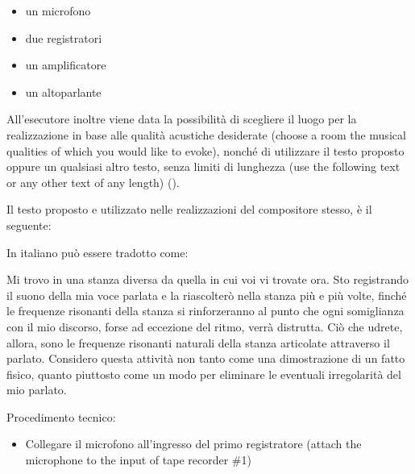 \begin{itemize}
    \item un microfono
    \item due registratori
    \item un amplificatore
    \item un altoparlante
\end{itemize}

All'esecutore inoltre viene data la possibilità di scegliere il luogo per la realizzazione in base alle qualità acustiche desiderate (choose a room the musical qualities of which you would like to evoke), nonché di utilizzare il testo proposto oppure un qualsiasi altro testo, senza limiti di lunghezza (use the following text or any other text of any length) (\cite{Lucier1995}).

Il testo proposto e utilizzato nelle realizzazioni del compositore stesso, è il seguente:


In italiano può essere tradotto come:

Mi trovo in una stanza diversa da quella in cui voi vi trovate ora. Sto registrando il suono della mia voce parlata e la riascolterò nella stanza più e più volte, finché le frequenze risonanti della stanza si rinforzeranno al punto che ogni somiglianza con il mio discorso, forse ad eccezione del ritmo, verrà distrutta. Ciò che udrete, allora, sono le frequenze risonanti naturali della stanza articolate attraverso il parlato. Considero questa attività non tanto come una dimostrazione di un fatto fisico, quanto piuttosto come un modo per eliminare le eventuali irregolarità del mio parlato.

Procedimento tecnico:

\begin{itemize}
    \item Collegare il microfono all'ingresso del primo registratore (attach the microphone to the input of tape recorder \#1)
\end{itemize}


